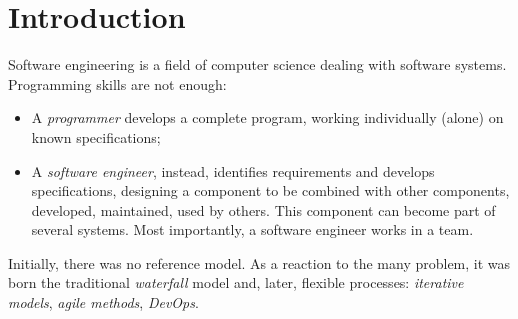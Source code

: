 \section{Introduction}

Software engineering is a field of computer science dealing with software systems. Programming skills are not enough:

\begin{itemize}
	\item A \textit{programmer} develops a complete program, working individually (alone) on known specifications;
	\item A \textit{software engineer}, instead, identifies requirements and develops specifications, designing a component to be combined with other components, developed, maintained, used by others. This component can become part of several systems. Most importantly, a software engineer works in a team.
\end{itemize}

Initially, there was no reference model. As a reaction to the many problem, it was born the traditional \textit{waterfall} model and, later, flexible processes: \textit{iterative models}, \textit{agile methods}, \textit{DevOps}.
